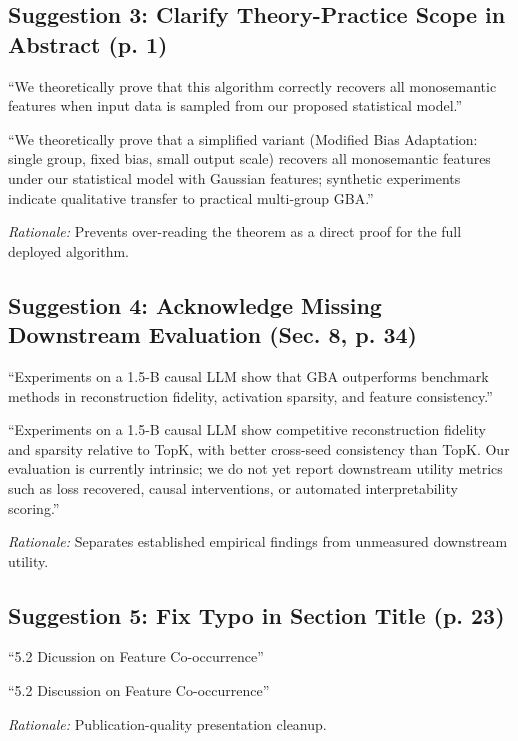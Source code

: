 \documentclass[11pt,a4paper]{article}
\begin{document}
\subsection*{Suggestion 3: Clarify Theory-Practice Scope in Abstract (p. 1)}
\begin{originaltext}
``We theoretically prove that this algorithm correctly recovers all monosemantic features when input data is sampled from our proposed statistical model.''
\end{originaltext}
\begin{revisedtext}
``We theoretically prove that a simplified variant (Modified Bias Adaptation: single group, fixed bias, small output scale) recovers all monosemantic features under our statistical model with Gaussian features; synthetic experiments indicate qualitative transfer to practical multi-group GBA.''
\end{revisedtext}
\textit{Rationale:} Prevents over-reading the theorem as a direct proof for the full deployed algorithm.

\subsection*{Suggestion 4: Acknowledge Missing Downstream Evaluation (Sec. 8, p. 34)}
\begin{originaltext}
``Experiments on a 1.5-B causal LLM show that GBA outperforms benchmark methods in reconstruction fidelity, activation sparsity, and feature consistency.''
\end{originaltext}
\begin{revisedtext}
``Experiments on a 1.5-B causal LLM show competitive reconstruction fidelity and sparsity relative to TopK, with better cross-seed consistency than TopK. Our evaluation is currently intrinsic; we do not yet report downstream utility metrics such as loss recovered, causal interventions, or automated interpretability scoring.''
\end{revisedtext}
\textit{Rationale:} Separates established empirical findings from unmeasured downstream utility.

\subsection*{Suggestion 5: Fix Typo in Section Title (p. 23)}
\begin{originaltext}
``5.2 Dicussion on Feature Co-occurrence''
\end{originaltext}
\begin{revisedtext}
``5.2 Discussion on Feature Co-occurrence''
\end{revisedtext}
\textit{Rationale:} Publication-quality presentation cleanup.
\end{document}
